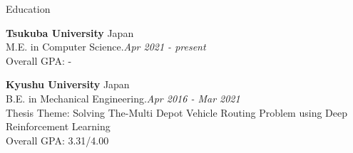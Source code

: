 \documentclass{resume} %
\begin{document}
\begin{rSection}{Education}

{\bf Tsukuba University} \hfill {Japan} 
\\ M.E. in Computer Science.\hfill {\em Apr 2021 - present}
\\ Overall GPA: -

{\bf Kyushu University} \hfill {Japan} 
\\ B.E. in Mechanical Engineering.\hfill {\em Apr 2016 - Mar 2021}
\\ Thesis Theme: Solving The-Multi Depot Vehicle Routing Problem using Deep Reinforcement Learning
\\ Overall GPA: 3.31/4.00


\end{rSection}




\end{document}
